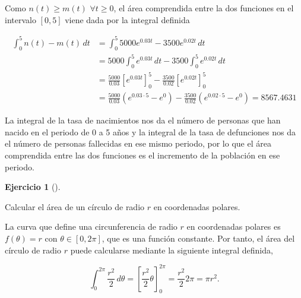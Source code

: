 \documentclass[
  spanish,
  a4paper,
]{scrreport}
\theoremstyle{definition}
\newtheorem{exercise}{Ejercicio}[chapter]
\theoremstyle{remark}
\begin{document}
\begin{tcolorbox}[enhanced jigsaw, arc=.35mm, bottomrule=.15mm, bottomtitle=1mm, breakable, colback=white, colbacktitle=quarto-callout-tip-color!10!white, colframe=quarto-callout-tip-color-frame, coltitle=black, left=2mm, leftrule=.75mm, opacityback=0, opacitybacktitle=0.6, rightrule=.15mm, title=\textcolor{quarto-callout-tip-color}{\faLightbulb}\hspace{0.5em}{Solución}, titlerule=0mm, toprule=.15mm, toptitle=1mm]

Como \(n(t)\geq m(t)\) \(\forall t\geq 0\), el área comprendida entre la
dos funciones en el intervalo \([0,5]\) viene dada por la integral
definida

\begin{align*}
\int_0^5 n(t)-m(t)\,dt 
&= \int_0^5 5000e^{0.03t}-3500 e^{0.02t}\,dt\\
&= 5000\int_0^5 e^{0.03t}\,dt -3500 \int_0^5 e^{0.02t}\,dt \\
&= \frac{5000}{0.03}[e^{0.03t}]_0^5 - \frac{3500}{0.02}[e^{0.02t}]_0^5\\
&= \frac{5000}{0.03}(e^{0.03\cdot 5}-e^0) - \frac{3500}{0.02}(e^{0.02\cdot 5}-e^0)
= 8567.4631
\end{align*}

La integral de la tasa de nacimientos nos da el número de personas que
han nacido en el periodo de 0 a 5 años y la integral de la tasa de
defunciones nos da el número de personas fallecidas en ese mismo
periodo, por lo que el área comprendida entre las dos funciones es el
incremento de la población en ese periodo.

\end{tcolorbox}

\begin{exercise}[]\protect\hypertarget{exr-area-circulo-polares}{}\label{exr-area-circulo-polares}

Calcular el área de un círculo de radio \(r\) en coordenadas polares.

\end{exercise}

\begin{tcolorbox}[enhanced jigsaw, arc=.35mm, bottomrule=.15mm, bottomtitle=1mm, breakable, colback=white, colbacktitle=quarto-callout-tip-color!10!white, colframe=quarto-callout-tip-color-frame, coltitle=black, left=2mm, leftrule=.75mm, opacityback=0, opacitybacktitle=0.6, rightrule=.15mm, title=\textcolor{quarto-callout-tip-color}{\faLightbulb}\hspace{0.5em}{Solución}, titlerule=0mm, toprule=.15mm, toptitle=1mm]

La curva que define una circunferencia de radio \(r\) en coordenadas
polares es \(f(\theta)=r\) con \(\theta\in[0,2\pi]\), que es una función
constante. Por tanto, el área del círculo de radio \(r\) puede
calcularse mediante la siguiente integral definida,

\[
\int_0^{2\pi} \frac{r^2}{2}\,d\theta = \left[\frac{r^2}{2}\theta \right]_0^{2\pi} = \frac{r^2}{2}2\pi = \pi r^2.
\]

\end{tcolorbox}
\end{document}
